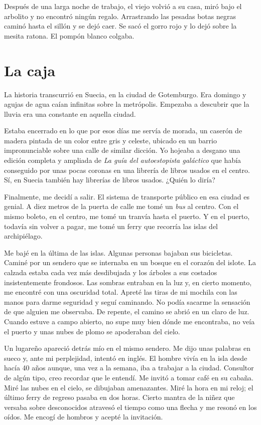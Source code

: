 \documentclass[11pt,twoside,openright,a6paper]{book}
\begin{document}
Después de una larga noche de trabajo, el viejo volvió a su casa, miró bajo el arbolito y no encontró ningún regalo. Arrastrando las pesadas botas negras caminó hasta el sillón y se dejó caer. Se sacó el gorro rojo y lo dejó sobre la mesita ratona. El pompón blanco colgaba.

\chapter*{La caja}

La historia transcurrió en Suecia, en la ciudad de Gotemburgo. Era domingo y agujas de agua caían infinitas sobre la metrópolis. Empezaba a descubrir que la lluvia era una constante en aquella ciudad.

Estaba encerrado en lo que por esos días me servía de morada, un caserón de madera pintada de un color entre gris y celeste, ubicado en un barrio impronunciable sobre una calle de similar dicción. Yo hojeaba a desgano una edición completa y ampliada de \emph{La guía del autoestopista galáctico} que había conseguido por unas pocas coronas en una librería de libros usados en el centro. Sí, en Suecia también hay librerías de libros usados. ¿Quién lo diría?

Finalmente, me decidí a salir. El sistema de transporte público en esa ciudad es genial.  A diez metros de la puerta de calle me tomé un \emph{bus} al centro. Con el mismo boleto, en el centro, me tomé un tranvía hasta el puerto. Y en el puerto, todavía sin volver a pagar, me tomé un ferry que recorría las islas del archipiélago.

Me bajé en la última de las islas. Algunas personas bajaban sus bicicletas. Caminé por un sendero que se internaba en un bosque en el corazón del islote. La calzada estaba cada vez más desdibujada y los árboles a sus costados insistentemente frondosos. Las sombras entraban en la luz y, en cierto momento, me encontré con una oscuridad total. Apreté las tiras de mi mochila con las manos para darme seguridad y seguí caminando. No podía sacarme la sensación de que alguien me observaba. De repente, el camino se abrió en un claro de luz. Cuando estuve a campo abierto, no supe muy bien dónde me encontraba, no veía el puerto y unas nubes de plomo se apoderaban del cielo.

Un lugareño apareció detrás mío en el mismo sendero. Me dijo unas palabras en sueco y, ante mi perplejidad, intentó en inglés. El hombre vivía en la isla desde hacía 40 años aunque, una vez a la semana, iba a trabajar a la ciudad. Consultor de algún tipo, creo recordar que le entendí. Me invitó a tomar café en su cabaña. Miré las nubes en el cielo, se dibujaban amenazantes. Miré la hora en mi reloj; el último ferry de regreso pasaba en dos horas. Cierto mantra de la niñez que versaba sobre desconocidos atravesó el tiempo como una flecha y me resonó en los oídos. Me encogí de hombros y acepté la invitación.
\end{document}
